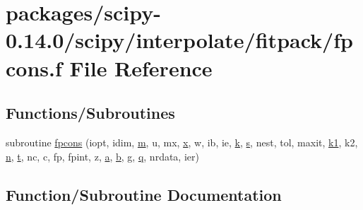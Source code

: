 \hypertarget{fpcons_8f}{}\section{packages/scipy-\/0.14.0/scipy/interpolate/fitpack/fpcons.f File Reference}
\label{fpcons_8f}
\subsection*{Functions/\+Subroutines}
\begin{DoxyCompactItemize}
\item 
subroutine \hyperlink{fpcons_8f_a4e1f462f1329cceab65f847216a67eff}{fpcons} (iopt, idim, \hyperlink{indexexpr_8h_ab72fdb4031d47b75ab26dd18a437bcdc}{m}, u, mx, \hyperlink{vecnorm1_8cc_ac73eed9e41ec09d58f112f06c2d6cb63}{x}, w, ib, ie, \hyperlink{indexexpr_8h_abb72938a198351550846b37a84588b63}{k}, \hyperlink{indexexpr_8h_ae024b0db549122b44c349ae28ec990dc}{s}, nest, tol, maxit, \hyperlink{cephes_8h_aea4a28d7f448efcb4713416bd1f3cf49}{k1}, k2, \hyperlink{indexexpr_8h_ab427e2e2b4d6cec55fa088ea2a692ace}{n}, \hyperlink{indexexpr_8h_a01709998b82be3f34e0412206618d09d}{t}, nc, c, fp, fpint, z, \hyperlink{gen__mat5files_8m_aae328bf20413f220e38aec4d95bfd6da}{a}, \hyperlink{gen__mat5files_8m_a7b38767b3b6a8dae167e5afa4fc340b0}{b}, g, \hyperlink{indexexpr_8h_ac886c3584e464b5533390d7440c9dd98}{q}, nrdata, ier)
\end{DoxyCompactItemize}


\subsection{Function/\+Subroutine Documentation}
\hypertarget{fpcons_8f_a4e1f462f1329cceab65f847216a67eff}{}
